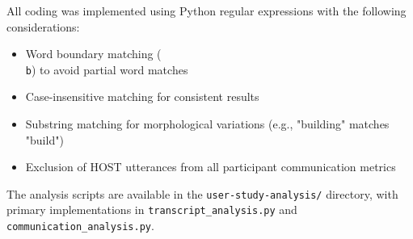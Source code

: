 All coding was implemented using Python regular expressions with the following considerations:
\begin{itemize}
\item Word boundary matching (\texttt{\\b}) to avoid partial word matches
\item Case-insensitive matching for consistent results
\item Substring matching for morphological variations (e.g., "building" matches "build")
\item Exclusion of HOST utterances from all participant communication metrics
\end{itemize}

The analysis scripts are available in the \texttt{user-study-analysis/} directory, with primary implementations in \texttt{transcript\_analysis.py} and \texttt{communication\_analysis.py}.
